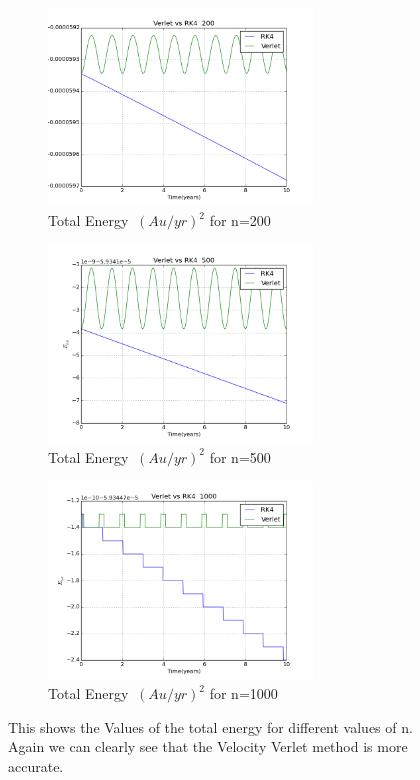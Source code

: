 \documentclass[11pt,a4wide]{article}
\begin{document}
\begin{figure}[H]
\begin{subfigure}[b]{0.5\linewidth}
    \centering
    \includegraphics[width=70mm]{E200.png}
    \caption{Total Energy $\ (Au/yr)^2$ for n=200} 
    \label{fig7:a} 
    \vspace{4ex}
\end{subfigure}%
\begin{subfigure}[b]{0.5\linewidth}
    \centering
    \includegraphics[width=70mm]{E500.png}
    \caption{Total Energy $\ (Au/yr)^2$ for n=500} 
    \label{fig7:b} 
    \vspace{4ex}
\end{subfigure}
\begin{subfigure}[b]{0.5\linewidth}
    \centering
    \includegraphics[width=70mm]{EE3.png}
    \caption{Total Energy $\ (Au/yr)^2$ for n=1000} 
    \label{fig7:c} 
    \vspace{4ex}
\end{subfigure}%
\caption{This shows the Values of the total energy for different values of n. Again we can clearly see that the Velocity Verlet method is more accurate.}
\end{figure}
\end{document}
